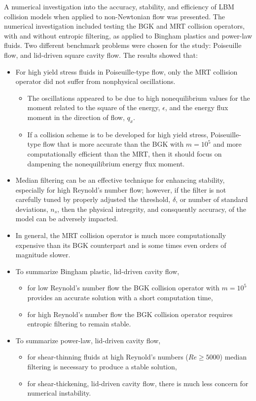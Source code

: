 A numerical investigation into the accuracy, stability, and efficiency of LBM collision models when applied to non-Newtonian flow was presented.
The numerical investigation included testing the BGK and MRT collision operators, with and without entropic filtering, as applied to Bingham plastics and power-law fluids.
Two different benchmark problems were chosen for the study: Poiseuille flow, and lid-driven square cavity flow.
The results showed that:
\begin{itemize}
  \item For high yield stress fluids in Poiseuille-type flow, only the MRT collision operator did not suffer from nonphysical oscillations.
  \begin{itemize}
      \item The oscillations appeared to be due to high nonequilibrium values for the moment related to the square of the energy, $\epsilon$, and the energy flux moment in the direction of flow, $q_x$.
      \item If a collision scheme is to be developed for high yield stress, Poiseuille-type flow that is more accurate than the BGK with $m = 10^5$ and more computationally efficient than the MRT, then it should focus on dampening the nonequilibrium energy flux moment.
    \end{itemize}
  \item Median filtering can be an effective technique for enhancing stability, especially for high Reynold's number flow; however, if the filter is not carefully tuned by properly adjusted the threshold, $\delta$, or number of standard deviations, $n_s$, then the physical intregrity, and consquently accuracy, of the model can be adversely impacted.
  \item In general, the MRT collision operator is much more computationally expensive than its BGK counterpart and is some times even orders of magnitude slower.
  \item To summarize Bingham plastic, lid-driven cavity flow,
    \begin{itemize}
  \item for low Reynold's number flow the BGK collision operator with $m = 10^5$ provides an accurate solution with a short computation time,
    \item for high Reynold's number flow the BGK collision operator requires entropic filtering to remain stable.
    \end{itemize}
  \item To summarize power-law, lid-driven cavity flow,
    \begin{itemize}
      \item for shear-thinning fluids at high Reynold's numbers ($Re \ge 5000$) median filtering is necessary to produce a stable solution,
  \item for shear-thickening, lid-driven cavity flow, there is much less concern for numerical instability.
    \end{itemize}
\end{itemize}


